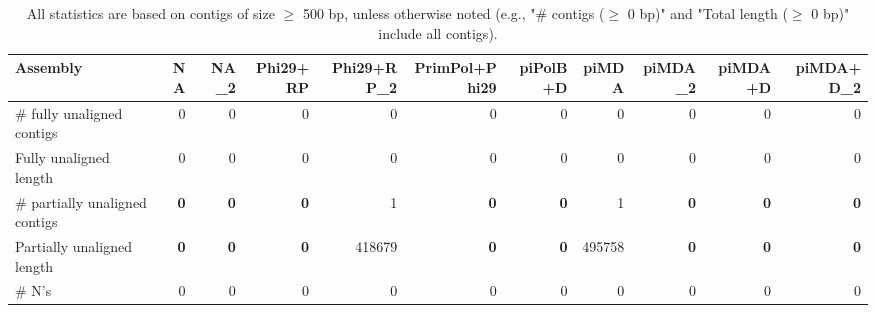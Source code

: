 \documentclass[12pt,a4paper]{article}
\begin{document}
\begin{table}[ht]
\begin{center}
\caption{All statistics are based on contigs of size $\geq$ 500 bp, unless otherwise noted (e.g., "\# contigs ($\geq$ 0 bp)" and "Total length ($\geq$ 0 bp)" include all contigs).}
\begin{tabular}{|l*{10}{|r}|}
\hline
Assembly & NA & NA\_2 & Phi29+RP & Phi29+RP\_2 & PrimPol+Phi29 & piPolB+D & piMDA & piMDA\_2 & piMDA+D & piMDA+D\_2 \\ \hline
\# fully unaligned contigs & 0 & 0 & 0 & 0 & 0 & 0 & 0 & 0 & 0 & 0 \\ \hline
Fully unaligned length & 0 & 0 & 0 & 0 & 0 & 0 & 0 & 0 & 0 & 0 \\ \hline
\# partially unaligned contigs & {\bf 0} & {\bf 0} & {\bf 0} & 1 & {\bf 0} & {\bf 0} & 1 & {\bf 0} & {\bf 0} & {\bf 0} \\ \hline
Partially unaligned length & {\bf 0} & {\bf 0} & {\bf 0} & 418679 & {\bf 0} & {\bf 0} & 495758 & {\bf 0} & {\bf 0} & {\bf 0} \\ \hline
\# N's & 0 & 0 & 0 & 0 & 0 & 0 & 0 & 0 & 0 & 0 \\ \hline
\end{tabular}
\end{center}
\end{table}
\end{document}
